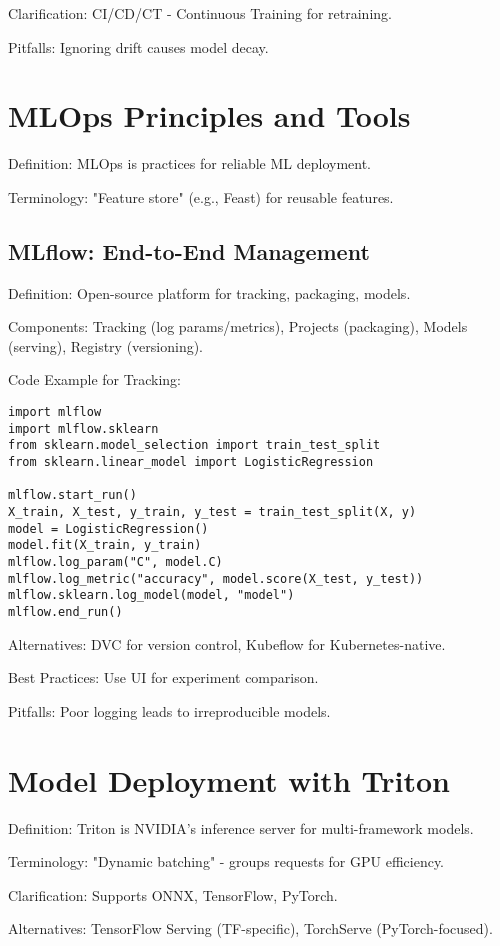 \documentclass[11pt]{article}
\begin{document}
Clarification: CI/CD/CT - Continuous Training for retraining.

Pitfalls: Ignoring drift causes model decay.

\section{MLOps Principles and Tools}
Definition: MLOps is practices for reliable ML deployment.

Terminology: "Feature store" (e.g., Feast) for reusable features.

\subsection{MLflow: End-to-End Management}
Definition: Open-source platform for tracking, packaging, models.

Components: Tracking (log params/metrics), Projects (packaging), Models (serving), Registry (versioning).

Code Example for Tracking:
\begin{verbatim}
import mlflow
import mlflow.sklearn
from sklearn.model_selection import train_test_split
from sklearn.linear_model import LogisticRegression

mlflow.start_run()
X_train, X_test, y_train, y_test = train_test_split(X, y)
model = LogisticRegression()
model.fit(X_train, y_train)
mlflow.log_param("C", model.C)
mlflow.log_metric("accuracy", model.score(X_test, y_test))
mlflow.sklearn.log_model(model, "model")
mlflow.end_run()
\end{verbatim}

Alternatives: DVC for version control, Kubeflow for Kubernetes-native.

Best Practices: Use UI for experiment comparison.

Pitfalls: Poor logging leads to irreproducible models.

\section{Model Deployment with Triton}
Definition: Triton is NVIDIA's inference server for multi-framework models.

Terminology: "Dynamic batching" - groups requests for GPU efficiency.

Clarification: Supports ONNX, TensorFlow, PyTorch.

Alternatives: TensorFlow Serving (TF-specific), TorchServe (PyTorch-focused).
\end{document}
